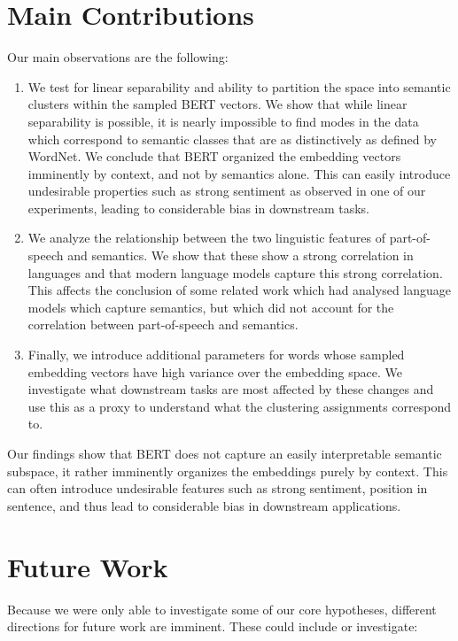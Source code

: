 \documentclass[a4paper,12pt,oneside,openright]{report}
\begin{document}
\section{Main Contributions}

Our main observations are the following: \\

\begin{enumerate}
\item We test for linear separability and ability to partition the space into semantic clusters within the sampled BERT vectors.
We show that while linear separability is possible, it is nearly impossible to find modes in the data which correspond to semantic classes that are as distinctively as defined by WordNet.
We conclude that BERT organized the embedding vectors imminently by context, and not by semantics alone.
This can easily introduce undesirable properties such as strong sentiment as observed in one of our experiments, leading to considerable bias in downstream tasks.
\item We analyze the relationship between the two linguistic features of part-of-speech and semantics. 
We show that these show a strong correlation in languages and that modern language models capture this strong correlation.
This affects the conclusion of some related work which had analysed language models which capture semantics, but which did not account for the correlation between part-of-speech and semantics.
\item Finally, we introduce additional parameters for words whose sampled embedding vectors have high variance over the embedding space.
We investigate what downstream tasks are most affected by these changes and use this as a proxy to understand what the clustering assignments correspond to. 
\end{enumerate}

\hfill \break

Our findings show that BERT does not capture an easily interpretable semantic subspace, it rather imminently organizes the embeddings purely by context.
This can often introduce undesirable features such as strong sentiment, position in sentence, and thus lead to considerable bias in downstream applications.

\section{Future Work}

Because we were only able to investigate some of our core hypotheses, different directions for future work are imminent.
These could include or investigate:
\end{document}
